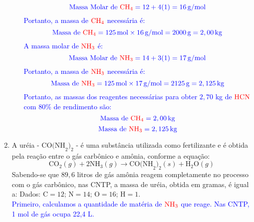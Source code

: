 \documentclass[a4paper, 12pt]{article}
\begin{document}
\begin{enumerate}
\begin{enumerate}[align=left, labelsep=-0.5em]
                    \[
                        \textcolor{blue}{\text{Massa Molar de } \textcolor{red}{\text{CH}_4} = 12 + 4(1) = 16 \, \text{g/mol}}
                    \]
                    \textcolor{blue}{Portanto, a massa de \(\textcolor{red}{\text{CH}_4}\) necessária é:}
                    \[
                        \textcolor{blue}{\text{Massa de } \textcolor{red}{\text{CH}_4} = 125 \, \text{mol} \times 16 \, \text{g/mol} = 2000 \, \text{g} = 2,00 \, \text{kg}}
                    \]
                    \textcolor{blue}{A massa molar de \(\textcolor{red}{\text{NH}_3}\) é:}
                    \[
                        \textcolor{blue}{\text{Massa Molar de } \textcolor{red}{\text{NH}_3} = 14 + 3(1) = 17 \, \text{g/mol}}
                    \]
                    \textcolor{blue}{Portanto, a massa de \(\textcolor{red}{\text{NH}_3}\) necessária é:}
                    \[
                        \textcolor{blue}{\text{Massa de } \textcolor{red}{\text{NH}_3} = 125 \, \text{mol} \times 17 \, \text{g/mol} = 2125 \, \text{g} = 2,125 \, \text{kg}}
                    \]
                    \textcolor{blue}{Portanto, as massas dos reagentes necessárias para obter $2,70$ kg de \(\textcolor{red}{\text{HCN}}\) com $80\%$ de rendimento são:}
                    \[
                        \textcolor{blue}{\text{Massa de } \textcolor{red}{\text{CH}_4} = 2,00 \, \text{kg}}
                    \]
                    \[
                        \textcolor{blue}{\text{Massa de } \textcolor{red}{\text{NH}_3} = 2,125 \, \text{kg}}
                    \]

          \end{enumerate}


    \item A uréia - $\text{CO(NH}_{2})_{2}$ - é uma substância utilizada como fertilizante
          e é obtida pela reação entre o gás carbônico e amônia, conforme a equação:
          \[
              \text{CO}_{2}(g) + 2\text{NH}_{3}(g) \rightarrow \text{CO(NH}_{2})_{2}(s)
              + \text{H}_{2}\text{O}(g)
          \]
          Sabendo-se que $89,6$ litros de gás amônia reagem completamente no processo
          com o gás carbônico, nas CNTP, a massa de uréia, obtida em gramas, é igual
          a: Dados: $\text{C}= 12$; $\text{N}= 14$; $\text{O}= 16$; $\text{H}= 1$.
          \\[20pt]
          \textcolor{blue}{Primeiro, calculamos a quantidade de matéria de \(\textcolor{red}{\text{NH}_3}\) que reage. Nas CNTP, 1 mol de gás ocupa 22,4 L.}


\end{enumerate}
\end{document}

